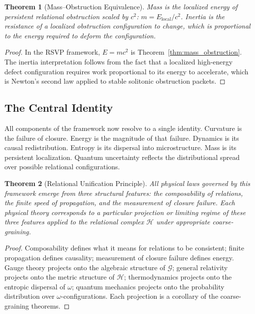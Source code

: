 \documentclass[12pt,a4paper,openany]{book}
\theoremstyle{plain}
\newtheorem{theorem}{Theorem}[chapter]
\theoremstyle{definition}
\theoremstyle{remark}
\begin{document}
\begin{theorem}[Mass--Obstruction Equivalence]
Mass is the localized energy of persistent relational obstruction scaled by $c^2$: $m = E_{\mathrm{local}}/c^2$. Inertia is the resistance of a localized obstruction configuration to change, which is proportional to the energy required to deform the configuration.
\end{theorem}

\begin{proof}
In the RSVP framework, $E = mc^2$ is Theorem~\ref{thm:mass_obstruction}. The inertia interpretation follows from the fact that a localized high-energy defect configuration requires work proportional to its energy to accelerate, which is Newton's second law applied to stable solitonic obstruction packets.
\end{proof}

\subsection{The Central Identity}

All components of the framework now resolve to a single identity. Curvature is the failure of closure. Energy is the magnitude of that failure. Dynamics is its causal redistribution. Entropy is its dispersal into microstructure. Mass is its persistent localization. Quantum uncertainty reflects the distributional spread over possible relational configurations.

\begin{theorem}[Relational Unification Principle]
\label{thm:relational_unification}
All physical laws governed by this framework emerge from three structural features: the composability of relations, the finite speed of propagation, and the measurement of closure failure. Each physical theory corresponds to a particular projection or limiting regime of these three features applied to the relational complex $\mathcal{H}$ under appropriate coarse-graining.
\end{theorem}

\begin{proof}
Composability defines what it means for relations to be consistent; finite propagation defines causality; measurement of closure failure defines energy. Gauge theory projects onto the algebraic structure of $\mathcal{G}$; general relativity projects onto the metric structure of $\mathcal{H}$; thermodynamics projects onto the entropic dispersal of $\omega$; quantum mechanics projects onto the probability distribution over $\omega$-configurations. Each projection is a corollary of the coarse-graining theorems.
\end{proof}
\end{document}
